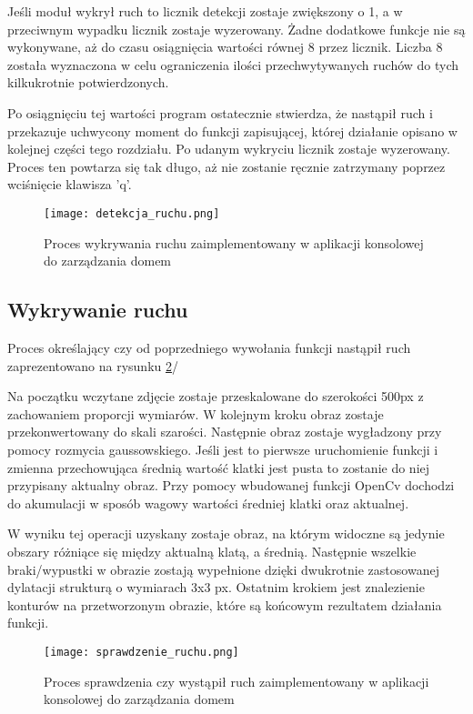 Jeśli moduł wykrył ruch to licznik detekcji zostaje zwiększony o 1, a w przeciwnym wypadku licznik zostaje wyzerowany. Żadne dodatkowe funkcje nie są wykonywane, aż do czasu osiągnięcia wartości równej 8 przez licznik. Liczba 8 została wyznaczona w celu ograniczenia ilości przechwytywanych ruchów do tych kilkukrotnie potwierdzonych.

Po osiągnięciu tej wartości program ostatecznie stwierdza, że nastąpił ruch i przekazuje uchwycony moment do funkcji zapisującej, której działanie opisano w kolejnej części tego rozdziału. Po udanym wykryciu licznik zostaje wyzerowany. Proces ten powtarza się tak długo, aż nie zostanie ręcznie zatrzymany poprzez wciśnięcie klawisza 'q'.
\begin{figure}[H]
	\centering
	\texttt{[image: detekcja\_ruchu.png]}
	\caption{Proces wykrywania ruchu zaimplementowany w aplikacji konsolowej do zarządzania domem}
	\label{fig:proces_detekcji}
\end{figure}

\subsection{Wykrywanie ruchu} \label{ss:wykrywanie}
Proces określający czy od poprzedniego wywołania funkcji nastąpił ruch zaprezentowano na rysunku \ref{fig:wykrywanie_ruchu}/

Na początku wczytane zdjęcie zostaje przeskalowane do szerokości 500px z zachowaniem proporcji wymiarów. W kolejnym kroku obraz zostaje przekonwertowany do skali szarości. Następnie obraz zostaje wygładzony przy pomocy rozmycia gaussowskiego. Jeśli jest to pierwsze uruchomienie funkcji i zmienna przechowująca średnią wartość klatki jest pusta to zostanie do niej przypisany aktualny obraz. Przy pomocy wbudowanej funkcji OpenCv dochodzi do akumulacji w sposób wagowy wartości średniej klatki oraz aktualnej.     

W wyniku tej operacji uzyskany zostaje obraz, na którym widoczne są jedynie obszary różniące się między aktualną klatą, a średnią. Następnie wszelkie braki/wypustki w obrazie zostają wypełnione dzięki dwukrotnie zastosowanej dylatacji strukturą o wymiarach 3x3 px. Ostatnim krokiem jest znalezienie konturów na przetworzonym obrazie, które są końcowym rezultatem działania funkcji.
 \begin{figure}[H]
	\centering
	\texttt{[image: sprawdzenie\_ruchu.png]}
	\caption{Proces sprawdzenia czy wystąpił ruch zaimplementowany w aplikacji konsolowej do zarządzania domem}
	\label{fig:wykrywanie_ruchu}
\end{figure}

